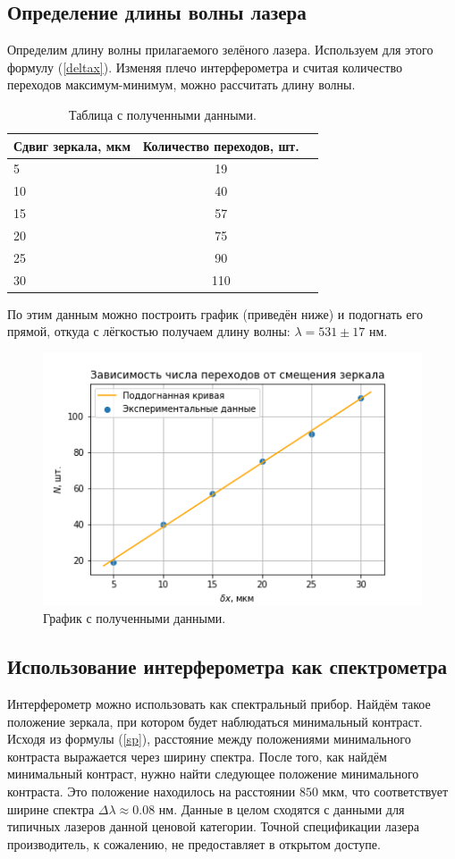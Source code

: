 \documentclass[a4paper, 12pt]{article}
\begin{document}
	\subsection*{Определение длины волны лазера}
	Определим длину волны прилагаемого зелёного лазера. Используем для этого формулу (\ref{deltax}). Изменяя плечо интерферометра и считая количество переходов максимум-минимум, можно рассчитать длину волны.
	\begin{table}[H]
		\centering
		\caption{Таблица с полученными данными.}
		\begin{tabular}[t]{lcc}
			\hline
			Сдвиг зеркала, мкм&Количество переходов, шт.\\
			\hline
			5&19\\
			10&40\\
			15&57\\
			20&75\\
			25&90\\
			30&110\\
			\hline
		\end{tabular}
	\end{table}
	По этим данным можно построить график (приведён ниже) и подогнать его прямой, откуда с лёгкостью получаем длину волны: $\lambda = 531 \pm 17$ нм.
	\begin{figure}[H]
		\centering
		\includegraphics[width=0.85\linewidth]{maic1.png}
		\caption{График с полученными данными.}
		\label{fig:4}
	\end{figure}
	\subsection*{Использование интерферометра как спектрометра}
	Интерферометр можно использовать как спектральный прибор. Найдём такое положение зеркала, при котором будет наблюдаться минимальный контраст. Исходя из формулы (\ref{sp}), расстояние между положениями минимального контраста выражается через ширину спектра. После того, как найдём минимальный контраст, нужно найти следующее положение минимального контраста. Это положение находилось на расстоянии $850$ мкм, что соответствует ширине спектра $\Delta \lambda \approx 0.08$ нм. Данные в целом сходятся с данными для типичных лазеров данной ценовой категории. Точной спецификации лазера производитель, к сожалению, не предоставляет в открытом доступе.
\end{document}
